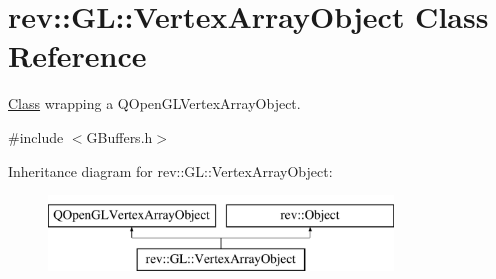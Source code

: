 \hypertarget{classrev_1_1_g_l_1_1_vertex_array_object}{}\section{rev\+::GL\+::Vertex\+Array\+Object Class Reference}
\label{classrev_1_1_g_l_1_1_vertex_array_object}


\mbox{\hyperlink{struct_class}{Class}} wrapping a Q\+Open\+G\+L\+Vertex\+Array\+Object.  




{\ttfamily \#include $<$G\+Buffers.\+h$>$}

Inheritance diagram for rev\+::GL\+::Vertex\+Array\+Object\+:\begin{figure}[H]
\begin{center}
\leavevmode
\includegraphics[height=2.000000cm]{classrev_1_1_g_l_1_1_vertex_array_object}
\end{center}
\end{figure}
